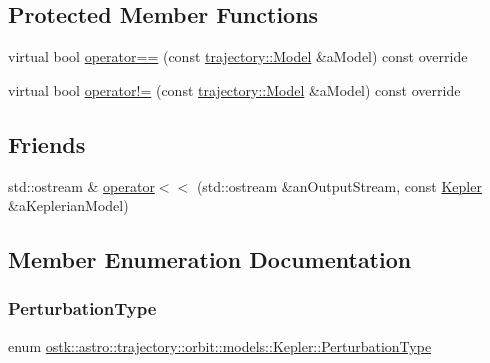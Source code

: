 \subsection*{Protected Member Functions}
\begin{DoxyCompactItemize}
\item 
virtual bool \hyperlink{classostk_1_1astro_1_1trajectory_1_1orbit_1_1models_1_1_kepler_ad2a61eb0cbd9887fc2180dc0818c209e}{operator==} (const \hyperlink{classostk_1_1astro_1_1trajectory_1_1_model}{trajectory\+::\+Model} \&a\+Model) const override
\item 
virtual bool \hyperlink{classostk_1_1astro_1_1trajectory_1_1orbit_1_1models_1_1_kepler_ab343575a423c5cecea4b21fa79c80726}{operator!=} (const \hyperlink{classostk_1_1astro_1_1trajectory_1_1_model}{trajectory\+::\+Model} \&a\+Model) const override
\end{DoxyCompactItemize}
\subsection*{Friends}
\begin{DoxyCompactItemize}
\item 
std\+::ostream \& \hyperlink{classostk_1_1astro_1_1trajectory_1_1orbit_1_1models_1_1_kepler_aedb386ce32716dfb187f89b52b023f2b}{operator$<$$<$} (std\+::ostream \&an\+Output\+Stream, const \hyperlink{classostk_1_1astro_1_1trajectory_1_1orbit_1_1models_1_1_kepler}{Kepler} \&a\+Keplerian\+Model)
\end{DoxyCompactItemize}


\subsection{Member Enumeration Documentation}
\mbox{\label{classostk_1_1astro_1_1trajectory_1_1orbit_1_1models_1_1_kepler_a3750f9177ff06a1938826e2c2881d5a9}} 
\subsubsection{\texorpdfstring{Perturbation\+Type}{PerturbationType}}
{\footnotesize\ttfamily enum \hyperlink{classostk_1_1astro_1_1trajectory_1_1orbit_1_1models_1_1_kepler_a3750f9177ff06a1938826e2c2881d5a9}{ostk\+::astro\+::trajectory\+::orbit\+::models\+::\+Kepler\+::\+Perturbation\+Type}\hspace{0.3cm}{\ttfamily [strong]}}

